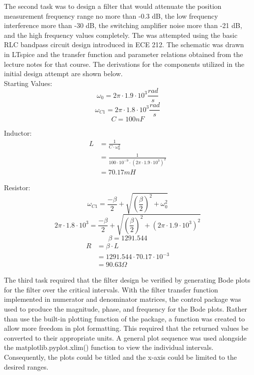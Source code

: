 \documentclass[12pt]{report}
\begin{document}
The second task was to design a filter that would attenuate the position measurement frequency range no more than -0.3 dB, the low frequency interference more than -30 dB, the switching amplifier noise more than -21 dB, and the high frequency values completely. The was attempted using the basic RLC bandpass circuit design introduced in ECE 212. The schematic was drawn in LTspice and the transfer function and parameter relations obtained from the lecture notes for that course. The derivations for the components utilized in the initial design attempt are shown below. \\

Starting Values:
\begin{equation*}
	\omega_0=2\pi\cdot 1.9\cdot 10^3\frac{rad}{s}
\end{equation*}
\begin{equation*}
	\omega_{C1}=2\pi\cdot 1.8\cdot 10^3\frac{rad}{s}
\end{equation*}
\begin{equation*}
	C = 100 nF
\end{equation*}

Inductor:
\begin{align*}
	L &= \frac{1}{C\cdot\omega_0^2} \\
	&= \frac{1}{100\cdot 10^{-9}\cdot(2\pi\cdot 1.9\cdot 10^3)^2} \\
	&= 70.17 mH
\end{align*}

Resistor:
\begin{equation*}
	\omega_{C1}=\frac{-\beta}{2}+\sqrt{(\frac{\beta}{2})^2+\omega_0^2}
\end{equation*}
\begin{equation*}
	2\pi\cdot 1.8\cdot 10^3=\frac{-\beta}{2}+\sqrt{(\frac{\beta}{2})^2+(2\pi\cdot 1.9\cdot 10^3)^2}
\end{equation*}
\begin{equation*}
	\beta=1291.544
\end{equation*}
\begin{align*}
	R &= \beta\cdot L \\
	&= 1291.544\cdot70.17\cdot 10^{-3} \\
	&= 90.63\Omega
\end{align*}

The third task required that the filter design be verified by generating Bode plots for the filter over the critical intervals. With the filter transfer function implemented in numerator and denominator matrices, the control package was used to produce the magnitude, phase, and frequency for the Bode plots. Rather than use the built-in plotting function of the package, a function was created to allow more freedom in plot formatting. This required that the returned values be converted to their appropriate units. A general plot sequence was used alongside the matplotlib.pyplot.xlim() function to view the individual intervals. Consequently, the plots could be titled and the x-axis could be limited to the desired ranges. \\
\end{document}
